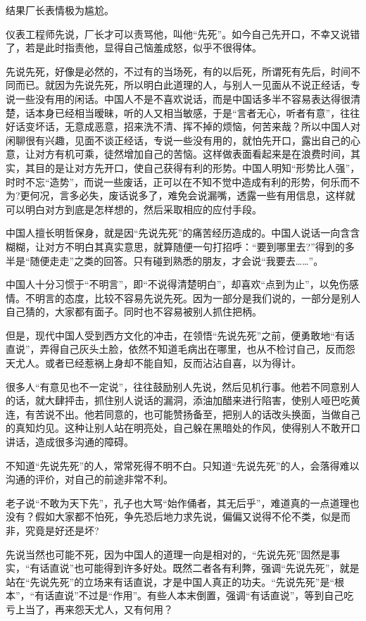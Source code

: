 \documentclass[fontset=fandol, a4paper, 12pt, openright]{ctexbook}
\begin{document}
结果厂长表情极为尴尬。

仪表工程师先说，厂长才可以责骂他，叫他“先死”。如今自己先开口，不幸又说错了，若是此时指责他，显得自己恼羞成怒，似乎不很得体。

先说先死，好像是必然的，不过有的当场死，有的以后死，所谓死有先后，时间不同而已。就因为先说先死，所以明白此道理的人，与别人一见面从不说正经话，专说一些没有用的闲话。中国人不是不喜欢说话，而是中国话多半不容易表达得很清楚，话本身已经相当暧昧，听的人又相当敏感，于是“言者无心，听者有意”，往往好话变坏话，无意成恶意，招来洗不清、挥不掉的烦恼，何苦来哉？所以中国人对闲聊很有兴趣，见面不谈正经话，专说一些没有用的，就怕先开口，露出自己的心意，让对方有机可乘，徒然增加自己的苦恼。这样做表面看起来是在浪费时间，其实，其目的是让对方先开口，使自己获得有利的形势。中国人明知“形势比人强”，时时不忘“造势”，而说一些废话，正可以在不知不觉中造成有利的形势，何乐而不为?更何况，言多必失，废话说多了，难免会说漏嘴，透露一些有用信息，这样就可以明白对方到底是怎样想的，然后采取相应的应付手段。

中国人擅长明哲保身，就是因“先说先死”的痛苦经历造成的。中国人说话一向含含糊糊，让对方不明白其真实意思，就算随便一句打招呼：“要到哪里去?”得到的多半是“随便走走”之类的回答。只有碰到熟悉的朋友，才会说“我要去……”。

中国人十分习惯于“不明言”，即“不说得清楚明白”，却喜欢“点到为止”，以免伤感情。不明言的态度，比较不容易先说先死。因为一部分是我们说的，一部分是别人自己猜的，大家都有面子。同时也不容易被别人抓住把柄。

但是，现代中国人受到西方文化的冲击，在领悟“先说先死”之前，便勇敢地“有话直说”，弄得自己灰头土脸，依然不知道毛病出在哪里，也从不检讨自己，反而怨天尤人。或者已经惹祸上身却不能自知，反而沾沾自喜，以为得计。

很多人“有意见也不一定说”，往往鼓励别人先说，然后见机行事。他若不同意别人的话，就大肆抨击，抓住别人说话的漏洞，添油加醋来进行陷害，使别人哑巴吃黄连，有苦说不出。他若同意的，也可能赞扬备至，把别人的话改头换面，当做自己的真知灼见。这种让别人站在明亮处，自己躲在黑暗处的作风，使得别人不敢开口讲话，造成很多沟通的障碍。

不知道“先说先死”的人，常常死得不明不白。只知道“先说先死”的人，会落得难以沟通的评价，对自己的前途非常不利。

老子说“不敢为天下先”，孔子也大骂“始作俑者，其无后乎”，难道真的一点道理也没有？假如大家都不怕死，争先恐后地力求先说，偏偏又说得不伦不类，似是而非，究竟是好还是坏?

先说当然也可能不死，因为中国人的道理一向是相对的，“先说先死”固然是事实，“有话直说”也可能得到许多好处。既然二者各有利弊，强调“先说先死”，就是站在“先说先死”的立场来有话直说，才是中国人真正的功夫。“先说先死”是“根本”，“有话直说”不过是“作用”。有些人本末倒置，强调“有话直说”，等到自己吃亏上当了，再来怨天尤人，又有何用？
\end{document}
